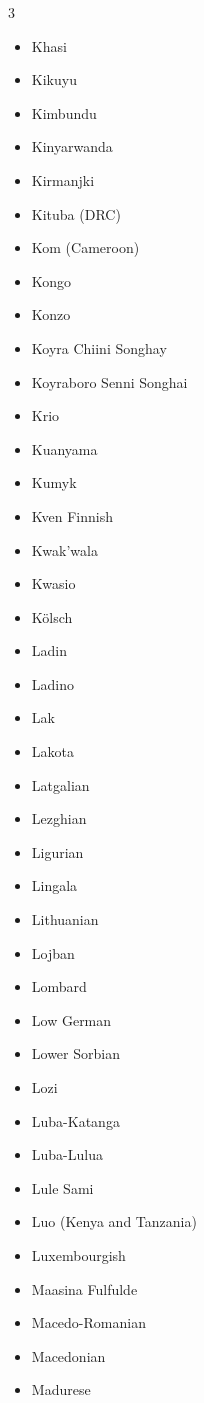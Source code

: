 \documentclass[paper=a4, 10pt]{scrbook}
\begin{document}
\begin{multicols}{3}
\begin{itemize}
        \item Khasi
        \item Kikuyu
        \item Kimbundu
        \item Kinyarwanda
        \item Kirmanjki
        \item Kituba (DRC)
        \item Kom (Cameroon)
        \item Kongo
        \item Konzo
        \item Koyra Chiini Songhay
        \item Koyraboro Senni Songhai
        \item Krio
        \item Kuanyama
        \item Kumyk
        \item Kven Finnish
        \item Kwak’wala
        \item Kwasio
        \item Kölsch
        \item Ladin
        \item Ladino
        \item Lak
        \item Lakota
        \item Latgalian
        \item Lezghian
        \item Ligurian
        \item Lingala
        \item Lithuanian
        \item Lojban
        \item Lombard
        \item Low German
        \item Lower Sorbian
        \item Lozi
        \item Luba-Katanga
        \item Luba-Lulua
        \item Lule Sami
        \item Luo (Kenya and Tanzania)
        \item Luxembourgish
        \item Maasina Fulfulde
        \item Macedo-Romanian
        \item Macedonian
        \item Madurese

\end{itemize}
\end{multicols}
\end{document}

